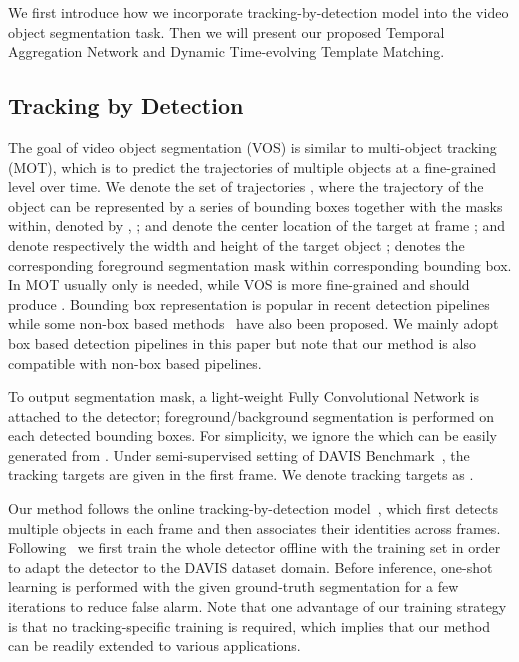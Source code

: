 \documentclass[10pt,twocolumn,letterpaper]{article}
\begin{document}
We first introduce how we incorporate tracking-by-detection model into the video object segmentation task.
Then we will present our proposed Temporal Aggregation Network and Dynamic Time-evolving Template Matching.

\subsection{Tracking by Detection}
\label{section: tbd}
The goal of video object segmentation (VOS) is similar to multi-object tracking (MOT),
which is to predict the trajectories of multiple objects at a fine-grained level over time.
We denote the set of trajectories , where
the trajectory of the  object can be represented by a series of bounding boxes together with the masks within, denoted by , ;  and  denote the center location of the target  at frame ;  and  denote respectively the width and height of the target object ;
 denotes the corresponding foreground segmentation mask within corresponding bounding box.
In MOT usually only  is needed, while VOS is more fine-grained and should produce .
Bounding box representation is popular in recent detection pipelines \cite{ren2015faster, he2017mask}
while some non-box based methods~\cite{chen2019tensormask} have also been proposed. We mainly adopt box based detection pipelines in this paper but note that our method is also compatible with non-box based pipelines.

To output segmentation mask, a light-weight Fully Convolutional Network is attached to the detector; foreground/background segmentation is performed on each detected bounding boxes.
For simplicity, we ignore the  which can be easily generated from .
Under semi-supervised setting of DAVIS Benchmark~\cite{perazzi2016davis, pont2017davis, caelles2018davis},  the tracking targets are given in the first frame.
We denote  tracking targets as .



Our method follows the online tracking-by-detection model~\cite{xiang2015learning}, which first detects multiple objects in each frame and then associates their identities across frames.
Following~\cite{caelles2017osvos, khoreva2017lucid} we first train the whole detector offline with the training set in order to adapt the detector to the DAVIS dataset domain.
Before inference, one-shot learning is performed with the given ground-truth segmentation for a few iterations to reduce false alarm.
Note that one advantage of our training strategy is that no tracking-specific training is required, which implies that our method can be readily extended to various applications.
\end{document}
